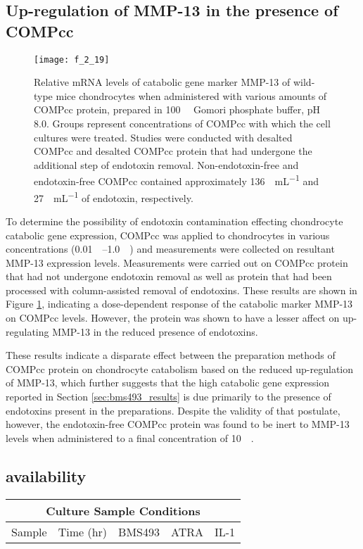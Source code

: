 \begin{refsection}
\subsection{Up-regulation of MMP-13 in the presence of COMPcc}
\label{sec:mmp13}
\begin{figure}[h!] \centering \texttt{[image: f\_2\_19]}
    \caption{Relative mRNA levels of catabolic gene marker MMP-13 of wild-type mice
    chondrocytes when administered with various amounts of COMPcc protein,
    prepared in \SI{100}{\milli\moLar} Gomori phosphate buffer, pH 8.0. Groups
    represent concentrations of COMPcc with which the cell cultures were treated.
    Studies were conducted with desalted COMPcc and desalted COMPcc protein that had
    undergone the additional step of endotoxin removal. Non-endotoxin-free and
    endotoxin-free COMPcc contained approximately \SI{136}{\EU\per\mL} and
    \SI{27}{\EU\per\mL} of endotoxin, respectively.}\label{fig:mmp13}
\end{figure}
To determine the possibility of endotoxin contamination effecting chondrocyte
catabolic gene expression, COMPcc was applied to chondrocytes in various
concentrations (\SIrange{0.01}{1.0}{\micro\moLar}) and measurements were collected
on resultant MMP-13 expression levels. Measurements were carried out on COMPcc
protein that had not undergone endotoxin removal as well as protein that had
been processed with column-assisted removal of endotoxins. These results are
shown in Figure \ref{fig:mmp13}, indicating a dose-dependent response of the
catabolic marker MMP-13 on COMPcc levels. However, the protein was shown to have a
lesser affect on up-regulating MMP-13 in the reduced presence of endotoxins.

These results indicate a disparate effect between the preparation methods of
COMPcc protein on chondrocyte catabolism based on the reduced up-regulation of
MMP-13, which further suggests that the high catabolic gene expression reported
in Section \ref{sec:bms493_results} is due primarily to the presence of
endotoxins present in the preparations. Despite the validity of that postulate,
however, the endotoxin-free COMPcc protein was found to be inert to MMP-13
levels when administered to a final concentration of \SI{10}{\nano\moLar}.

\subsection{ availability}
\begin{table}[h!]
    \centering
\begin{tabular}{ ccccc }
  \hline
  \multicolumn{5}{c}{Culture Sample Conditions} \\
  \hline
  Sample & Time (hr) & BMS493 & ATRA & IL-1 \\
  \hline


\end{tabular}
\end{table}
\end{refsection}
